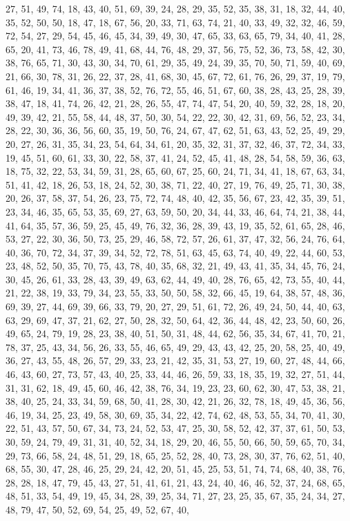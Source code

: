 \documentclass[
]{article}
\begin{document}
\begin{Schunk}
\begin{Soutput}
27, 51, 49, 74, 18, 43, 40, 51, 69, 39, 24, 28, 29, 35, 52, 35, 38, 31, 18, 32, 44, 40, 35, 52, 50, 50, 18, 47, 18, 67, 56, 20, 33, 71, 63, 74, 21, 40, 33, 49, 32, 32, 46, 59, 72, 54, 27, 29, 54, 45, 46, 45, 34, 39, 49, 30, 47, 65, 33, 63, 65, 79, 34, 40, 41, 28, 65, 20, 41, 73, 46, 78, 49, 41, 68, 44, 76, 48, 29, 37, 56, 75, 52, 36, 73, 58, 42, 30, 38, 76, 65, 71, 30, 43, 30, 34, 70, 61, 29, 35, 49, 24, 39, 35, 70, 50, 71, 59, 40, 69, 21, 66, 30, 78, 31, 26, 22, 37, 28, 41, 68, 30, 45, 67, 72, 61, 76, 26, 29, 37, 19, 79, 61, 46, 19, 34, 41, 36, 37, 38, 52, 76, 72, 55, 46, 51, 67, 60, 38, 28, 43, 25, 28, 39, 38, 47, 18, 41, 74, 26, 42, 21, 28, 26, 55, 47, 74, 47, 54, 20, 40, 59, 32, 28, 18, 20, 49, 39, 42, 21, 55, 58, 44, 48, 37, 50, 30, 54, 22, 22, 30, 42, 31, 69, 56, 52, 23, 34, 28, 22, 30, 36, 36, 56, 60, 35, 19, 50, 76, 24, 67, 47, 62, 51, 63, 43, 52, 25, 49, 29, 20, 27, 26, 31, 35, 34, 23, 54, 64, 34, 61, 20, 35, 32, 31, 37, 32, 46, 37, 72, 34, 33, 19, 45, 51, 60, 61, 33, 30, 22, 58, 37, 41, 24, 52, 45, 41, 48, 28, 54, 58, 59, 36, 63, 18, 75, 32, 22, 53, 34, 59, 31, 28, 65, 60, 67, 25, 60, 24, 71, 34, 41, 18, 67, 63, 34, 51, 41, 42, 18, 26, 53, 18, 24, 52, 30, 38, 71, 22, 40, 27, 19, 76, 49, 25, 71, 30, 38, 20, 26, 37, 58, 37, 54, 26, 23, 75, 72, 74, 48, 40, 42, 35, 56, 67, 23, 42, 35, 39, 51, 23, 34, 46, 35, 65, 53, 35, 69, 27, 63, 59, 50, 20, 34, 44, 33, 46, 64, 74, 21, 38, 44, 41, 64, 35, 57, 36, 59, 25, 45, 49, 76, 32, 36, 28, 39, 43, 19, 35, 52, 61, 65, 28, 46, 53, 27, 22, 30, 36, 50, 73, 25, 29, 46, 58, 72, 57, 26, 61, 37, 47, 32, 56, 24, 76, 64, 40, 36, 70, 72, 34, 37, 39, 34, 52, 72, 78, 51, 63, 45, 63, 74, 40, 49, 22, 44, 60, 53, 23, 48, 52, 50, 35, 70, 75, 43, 78, 40, 35, 68, 32, 21, 49, 43, 41, 35, 34, 45, 76, 24, 30, 45, 26, 61, 33, 28, 43, 39, 49, 63, 62, 44, 49, 40, 28, 76, 65, 42, 73, 55, 40, 44, 21, 22, 38, 19, 33, 79, 34, 23, 55, 33, 50, 50, 58, 32, 66, 45, 19, 64, 38, 57, 48, 36, 69, 39, 27, 44, 69, 39, 66, 33, 79, 20, 27, 29, 51, 61, 72, 26, 49, 24, 50, 44, 40, 63, 63, 29, 69, 47, 37, 21, 62, 27, 50, 28, 32, 50, 64, 42, 36, 44, 48, 42, 23, 50, 60, 26, 49, 65, 24, 79, 19, 28, 23, 38, 40, 51, 50, 31, 48, 44, 62, 56, 35, 34, 67, 41, 70, 21, 78, 37, 25, 43, 34, 56, 26, 33, 55, 46, 65, 49, 29, 43, 43, 42, 25, 20, 58, 25, 40, 49, 36, 27, 43, 55, 48, 26, 57, 29, 33, 23, 21, 42, 35, 31, 53, 27, 19, 60, 27, 48, 44, 66, 46, 43, 60, 27, 73, 57, 43, 40, 25, 33, 44, 46, 26, 59, 33, 18, 35, 19, 32, 27, 51, 44, 31, 31, 62, 18, 49, 45, 60, 46, 42, 38, 76, 34, 19, 23, 23, 60, 62, 30, 47, 53, 38, 21, 38, 40, 25, 24, 33, 34, 59, 68, 50, 41, 28, 30, 42, 21, 26, 32, 78, 18, 49, 45, 36, 56, 46, 19, 34, 25, 23, 49, 58, 30, 69, 35, 34, 22, 42, 74, 62, 48, 53, 55, 34, 70, 41, 30, 22, 51, 43, 57, 50, 67, 34, 73, 24, 52, 53, 47, 25, 30, 58, 52, 42, 37, 37, 61, 50, 53, 30, 59, 24, 79, 49, 31, 31, 40, 52, 34, 18, 29, 20, 46, 55, 50, 66, 50, 59, 65, 70, 34, 29, 73, 66, 58, 24, 48, 51, 29, 18, 65, 25, 52, 28, 40, 73, 28, 30, 37, 76, 62, 51, 40, 68, 55, 30, 47, 28, 46, 25, 29, 24, 42, 20, 51, 45, 25, 53, 51, 74, 74, 68, 40, 38, 76, 28, 28, 18, 47, 79, 45, 43, 27, 51, 41, 61, 21, 43, 24, 40, 46, 46, 52, 37, 24, 68, 65, 48, 51, 33, 54, 49, 19, 45, 34, 28, 39, 25, 34, 71, 27, 23, 25, 35, 67, 35, 24, 34, 27, 48, 79, 47, 50, 52, 69, 54, 25, 49, 52, 67, 40, 
\end{Soutput}
\end{Schunk}
\end{document}
